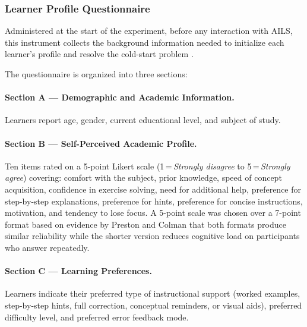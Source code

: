 \documentclass[ASNA,twocolumn]{USG} %
\begin{document}
\subsubsection{Learner Profile Questionnaire}

Administered at the start of the experiment, before any interaction
with AILS, this instrument collects the background information needed
to initialize each learner's profile and resolve the cold-start
problem \cite{Khanal2020}.

The questionnaire is organized into three sections:

\paragraph{Section A --- Demographic and Academic Information.}
Learners report age, gender, current educational level, and subject
of study.

\paragraph{Section B --- Self-Perceived Academic Profile.}
Ten items rated on a 5-point Likert scale (1\,=\,\emph{Strongly
disagree} to 5\,=\,\emph{Strongly agree}) covering: comfort with
the subject, prior knowledge, speed of concept acquisition,
confidence in exercise solving, need for additional help, preference
for step-by-step explanations, preference for hints, preference for
concise instructions, motivation, and tendency to lose focus.
A 5-point scale was chosen over a 7-point format based on evidence
by Preston and Colman \cite{Preston2000} that both formats produce
similar reliability while the shorter version reduces cognitive load
on participants who answer repeatedly.

\paragraph{Section C --- Learning Preferences.}
Learners indicate their preferred type of instructional support
(worked examples, step-by-step hints, full correction, conceptual
reminders, or visual aids), preferred difficulty level, and preferred
error feedback mode.



\end{document}
